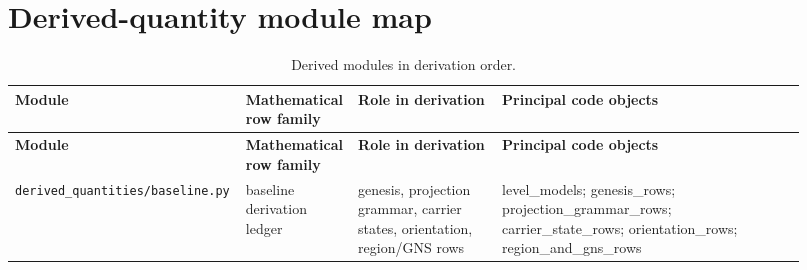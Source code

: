 \documentclass[11pt]{article}
\theoremstyle{remark}
\newcommand{\code}[1]{\texttt{#1}}
\numberwithin{equation}{section}
\begin{document}
\section{Derived-quantity module map}
\begin{longtable}{>{\raggedright\arraybackslash}p{0.23\linewidth}>{\raggedright\arraybackslash}p{0.13\linewidth}>{\raggedright\arraybackslash}p{0.18\linewidth}>{\raggedright\arraybackslash}p{0.38\linewidth}}
\caption{Derived modules in derivation order.}\label{tab:derived-map}\\
\toprule
\textbf{Module} & \textbf{Mathematical row family} & \textbf{Role in derivation} & \textbf{Principal code objects}\\
\midrule
\endfirsthead
\toprule
\textbf{Module} & \textbf{Mathematical row family} & \textbf{Role in derivation} & \textbf{Principal code objects}\\
\midrule
\endhead
\code{derived\_\allowbreak{}quantities/baseline.py} & baseline derivation ledger & genesis, projection grammar, carrier states, orientation, region/GNS rows & level\_\allowbreak{}models; genesis\_\allowbreak{}rows; projection\_\allowbreak{}grammar\_\allowbreak{}rows; carrier\_\allowbreak{}state\_\allowbreak{}rows; orientation\_\allowbreak{}rows; region\_\allowbreak{}and\_\allowbreak{}gns\_\allowbreak{}rows\\


\end{longtable}
\end{document}
